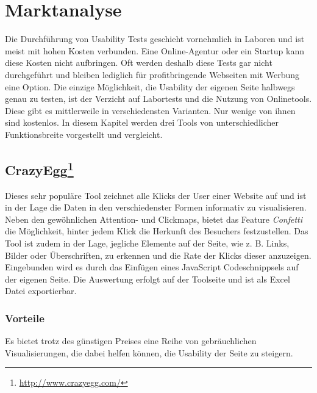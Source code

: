 %
%
%
%

\section{Marktanalyse}

Die Durchführung von Usability Tests geschieht vornehmlich in Laboren und ist meist mit hohen Kosten verbunden. Eine Online-Agentur oder ein Startup kann diese Kosten nicht aufbringen. Oft werden deshalb diese Tests gar nicht durchgeführt und bleiben lediglich für profitbringende Webseiten mit Werbung eine Option. Die einzige Möglichkeit, die Usability der eigenen Seite halbwegs genau zu testen, ist der Verzicht auf Labortests und die Nutzung von Onlinetools. Diese gibt es mittlerweile in verschiedensten Varianten. Nur wenige von ihnen sind kostenlos. In diesem Kapitel werden drei Tools von unterschiedlicher Funktionsbreite vorgestellt und vergleicht.

\subsection*{CrazyEgg\footnote{\url{http://www.crazyegg.com/}}}

Dieses sehr populäre Tool zeichnet alle Klicks der User einer Website auf und ist in der Lage die Daten in den verschiedenster Formen informativ zu visualisieren. Neben den gewöhnlichen Attention- und Clickmaps, bietet das Feature \textit{Confetti} die Möglichkeit, hinter jedem Klick die Herkunft des Besuchers festzustellen. Das Tool ist zudem in der Lage, jegliche Elemente auf der Seite, wie z. B. Links, Bilder oder Überschriften, zu erkennen und die Rate der Klicks dieser anzuzeigen. Eingebunden wird es durch das Einfügen eines JavaScript Codeschnippsels auf der eigenen Seite. Die Auswertung erfolgt auf der Toolseite und ist als Excel Datei exportierbar.

\subsubsection*{Vorteile}
Es bietet trotz des günstigen Preises eine Reihe von gebräuchlichen Visualisierungen, die dabei helfen können, die Usability der Seite zu steigern.


